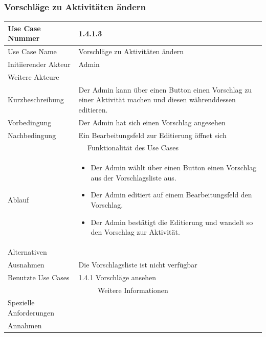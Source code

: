\documentclass[10pt,a4paper]{article}
\begin{document}
	\subsubsection{Vorschl\"age zu Aktivit\"aten \"andern}
	\begin{tabularx}{\textwidth}{|l|X|}
		\hline Use Case Nummer & 1.4.1.3 \\ 
		\hline Use Case Name & Vorschl\"age zu Aktivit\"aten \"andern \\ 
		\hline Initiierender Akteur & Admin \\
		\hline Weitere Akteure & \\
		\hline Kurzbeschreibung & Der Admin kann über einen Button einen Vorschlag zu einer Aktivit\"at machen und diesen währenddessen editieren. \\
		\hline Vorbedingung & Der Admin hat sich einen Vorschlag angesehen \\
		\hline Nachbedingung & Ein Bearbeitungsfeld zur Editierung öffnet sich\\
		\hline \multicolumn{2}{|c|}{Funktionalität des Use Cases}\\
		\hline Ablauf & \begin{itemize}
			\item Der Admin wählt über einen Button einen Vorschlag aus der Vorschlagsliste aus.
			\item Der Admin editiert auf einem Bearbeitungsfeld den Vorschlag.
			\item Der Admin bestätigt die Editierung und wandelt so den Vorschlag zur Aktivit\"at.
		\end{itemize} \\
		\hline Alternativen &  \\
		\hline Ausnahmen & Die Vorschlagsliste ist nicht verf\"ugbar \\
		\hline Benutzte Use Cases & 1.4.1 Vorschl\"age ansehen \\
		\hline \multicolumn{2}{|c|}{Weitere Informationen} \\
		\hline Spezielle Anforderungen &  \\
		\hline Annahmen &  \\
		\hline
	\end{tabularx}
\end{document}
